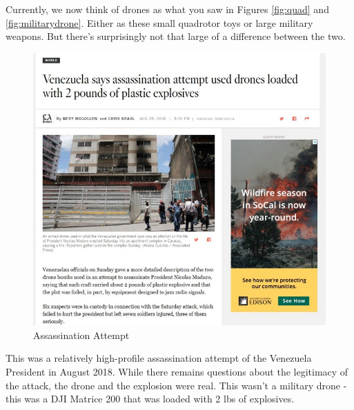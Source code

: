\documentclass[
]{book}
\theoremstyle{definition}
\theoremstyle{definition}
\theoremstyle{definition}
\theoremstyle{definition}
\theoremstyle{remark}
\begin{document}
Currently, we now think of drones as what you saw in Figures \ref{fig:quad} and \ref{fig:militarydrone}. Either as these small quadrotor toys or large military weapons. But there's surprisingly not that large of a difference between the two.

\begin{figure}

{\centering \includegraphics[width=0.8\linewidth]{images/history/Venezuela1} 

}

\caption{Assassination Attempt}\label{fig:venAssassin}
\end{figure}

This was a relatively high-profile assassination attempt of the Venezuela President in August 2018. While there remains questions about the legitimacy of the attack, the drone and the explosion were real. This wasn't a military drone - this was a DJI Matrice 200 that was loaded with 2 lbs of explosives.
\end{document}
